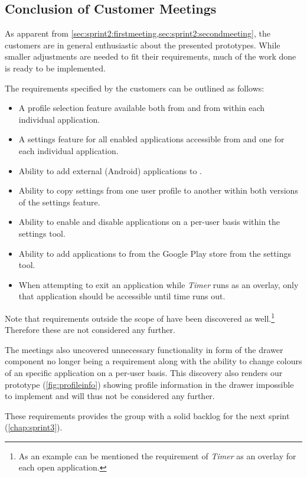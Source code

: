 \subsection{Conclusion of Customer Meetings}\label{sec:sprint2:conclusionmeetings}

As apparent from \cref{sec:sprint2:firstmeeting,sec:sprint2:secondmeeting}, the customers are in general enthusiastic about the presented prototypes.
While smaller adjustments are needed to fit their requirements, much of the work done is ready to be implemented.

The requirements specified by the customers can be outlined as follows:

\begin{itemize}
\item A profile selection feature available both from \launcher and from within each individual application.
\item A settings feature for all enabled applications accessible from \launcher and one for each individual application.
\item Ability to add external (Android) applications to \launcher.
\item Ability to copy settings from one user profile to another within both versions of the settings feature.
\item Ability to enable and disable applications on a per-user basis within the \launcher settings tool.
\item Ability to add applications to \launcher from the Google Play store from the \launcher settings tool.
\item When attempting to exit an application while \textit{Timer} runs as an overlay, only that application should be accessible until time runs out.
\end{itemize}

Note that requirements outside the scope of \launcher have been discovered as well.\footnote{As an example can be mentioned the requirement of \textit{Timer} as an overlay for each open application.}
Therefore these are not considered any further.

The meetings also uncovered unnecessary functionality in form of the drawer component no longer being a requirement along with the ability to change colours of an specific application on a per-user basis.
This discovery also renders our prototype (\cref{fig:profileinfo}) showing profile information in the drawer impossible to implement and will thus not be considered any further.

These requirements provides the group with a solid backlog for the next sprint (\cref{chap:sprint3}).